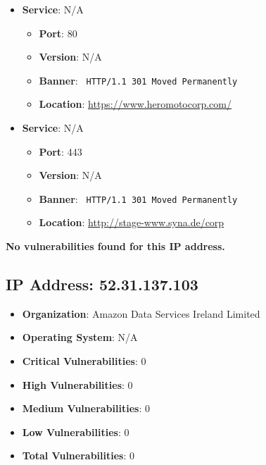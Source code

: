 \documentclass{article}
\begin{document}
\begin{itemize}
    
        \item \textbf{Service}: N/A
        \begin{itemize}
            \item \textbf{Port}: 80
            \item \textbf{Version}:  N/A 
            \item \textbf{Banner}: \texttt{
                HTTP/1.1 301 Moved Permanently
            }
            \item \textbf{Location}: \href{ https://www.heromotocorp.com/ }{ https://www.heromotocorp.com/ }
        \end{itemize}
    
        \item \textbf{Service}: N/A
        \begin{itemize}
            \item \textbf{Port}: 443
            \item \textbf{Version}:  N/A 
            \item \textbf{Banner}: \texttt{
                HTTP/1.1 301 Moved Permanently
            }
            \item \textbf{Location}: \href{ http://stage-www.syna.de/corp }{ http://stage-www.syna.de/corp }
        \end{itemize}
    
\end{itemize}


\textbf{No vulnerabilities found for this IP address.}




\clearpage



\subsection*{IP Address: 52.31.137.103}

\begin{itemize}
    \item \textbf{Organization}: Amazon Data Services Ireland Limited
    \item \textbf{Operating System}:  N/A 
    \item \textbf{Critical Vulnerabilities}: 0
    \item \textbf{High Vulnerabilities}: 0
    \item \textbf{Medium Vulnerabilities}: 0
    \item \textbf{Low Vulnerabilities}: 0
    \item \textbf{Total Vulnerabilities}: 0
\end{itemize}
\end{document}
